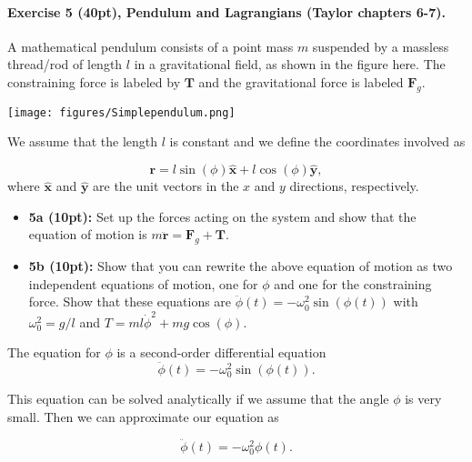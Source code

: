 \documentclass[%
oneside,                 %
final,                   %
10pt]{article}
\begin{document}
\noindent
\paragraph{Exercise 5 (40pt), Pendulum and Lagrangians (Taylor chapters 6-7).}
A mathematical pendulum consists of a point mass $m$ suspended by a massless thread/rod of length $l$ in a gravitational field, as shown in the figure here. The constraining force is labeled by $\bm{T}$
and the gravitational force is labeled $\bm{F}_g$.



\vspace{6mm}

\centerline{\texttt{[image: figures/Simplependulum.png]}}

\vspace{6mm}



We assume that the length $l$ is constant and we define the coordinates involved as

\[
\bm{r} = l\sin(\phi)\bm{\hat{x}}+l\cos(\phi)\bm{\hat{y}},
\]
where $\bm{\hat{x}}$ and $\bm{\hat{y}}$ are the unit vectors in the $x$ and $y$ directions, respectively.

\begin{itemize}
\item \textbf{5a (10pt):} Set up the forces acting on the system and show that the equation of motion is $m\ddot{\bm{r}}=\bm{F}_g+\bm{T}$.

\item \textbf{5b (10pt):} Show that you can rewrite the above equation of motion as two independent equations of motion, one for $\phi$ and one for the constraining force. Show that these equations are $\ddot{\phi}(t)=-\omega_0^2\sin{(\phi(t))}$ with $\omega_0^2=g/l$ and $T=ml\dot{\phi}^2+mg\cos{(\phi)}$.
\end{itemize}

\noindent
The equation for $\phi$ is a second-order differential equation
\[
\ddot{\phi}(t)=-\omega_0^2\sin{(\phi(t))}.
\]

This equation can be solved analytically if we assume that the angle $\phi$ is very small. Then we can approximate our equation as

\[
\ddot{\phi}(t)=-\omega_0^2\phi(t).
\]
\end{document}

